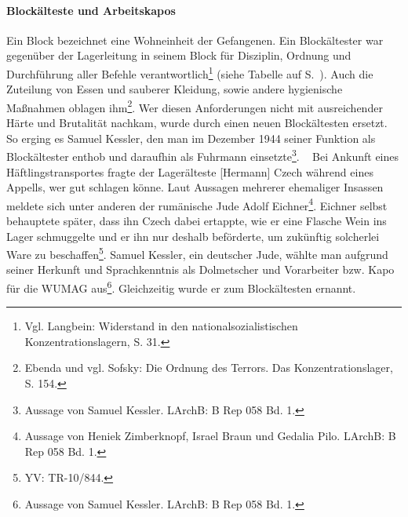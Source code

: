 \documentclass[a4paper,12pt,ngerman,
]{nisebook}
\begin{document}
\paragraph{Blockälteste und Arbeitskapos}
Ein Block bezeichnet eine Wohneinheit der Gefangenen. Ein Blockältester war gegenüber der Lagerleitung in seinem Block für Disziplin, Ordnung und Durchführung aller Befehle verantwortlich\footnote{Vgl. Langbein: Widerstand in den nationalsozialistischen Konzentrationslagern, S. 31.} (siehe Tabelle auf S.~\pageref{blockaeltesten}). Auch die Zuteilung von Essen und sauberer Kleidung, sowie andere hygienische Maßnahmen oblagen ihm\footnote{Ebenda und vgl. Sofsky: Die Ordnung des Terrors. Das Konzentrationslager, S. 154.}. Wer diesen Anforderungen nicht mit ausreichender Härte und Brutalität nachkam, wurde durch einen neuen Blockältesten ersetzt. So erging es Samuel Kessler, den man im Dezember 1944 seiner Funktion als Blockältester enthob und daraufhin als Fuhrmann einsetzte\footnote{Aussage von Samuel Kessler. LArchB: B Rep 058 Bd. 1.}.
~\newline
Bei Ankunft eines Häftlingstransportes fragte der Lagerälteste [Hermann] Czech während eines Appells, wer gut schlagen könne. Laut Aussagen mehrerer ehemaliger Insassen meldete sich unter anderen der rumänische Jude Adolf Eichner\footnote{Aussage von Heniek Zimberknopf, Israel Braun und Gedalia Pilo. LArchB: B Rep 058 Bd. 1.}. Eichner selbst behauptete später, dass ihn Czech dabei ertappte, wie er eine Flasche Wein ins Lager schmuggelte und er ihn nur deshalb beförderte, um zukünftig solcherlei Ware zu beschaffen\footnote{YV: TR-10/844.}. Samuel Kessler, ein deutscher Jude, wählte man aufgrund seiner Herkunft und Sprachkenntnis als Dolmetscher und Vorarbeiter bzw. Kapo für die WUMAG aus\footnote{Aussage von Samuel Kessler. LArchB: B Rep 058 Bd. 1.}. Gleichzeitig wurde er zum Blockältesten ernannt.\newline
\end{document}

